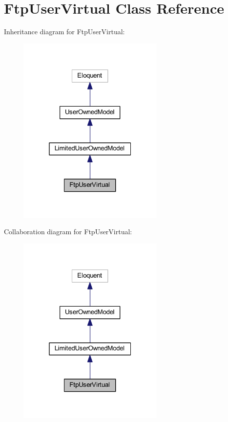 \hypertarget{class_ftp_user_virtual}{}\section{Ftp\+User\+Virtual Class Reference}
\label{class_ftp_user_virtual}


Inheritance diagram for Ftp\+User\+Virtual\+:
\nopagebreak
\begin{figure}[H]
\begin{center}
\leavevmode
\includegraphics[width=205pt]{class_ftp_user_virtual__inherit__graph}
\end{center}
\end{figure}


Collaboration diagram for Ftp\+User\+Virtual\+:
\nopagebreak
\begin{figure}[H]
\begin{center}
\leavevmode
\includegraphics[width=205pt]{class_ftp_user_virtual__coll__graph}
\end{center}
\end{figure}
